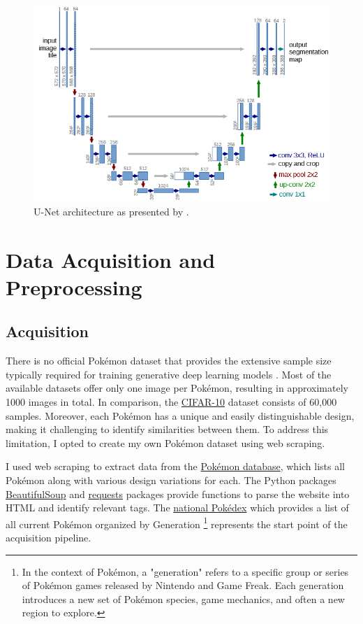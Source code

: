 \documentclass[12pt]{article}
\theoremstyle{plain}
\theoremstyle{definition}
\theoremstyle{remark}
\begin{document}
\begin{figure}[H]
	\centering
	\includegraphics[width=0.7\linewidth]{src/Images/u_net}
	\caption[U-Net architecture]{U-Net architecture as presented by \cite{Ronneberger2015}.}
	\label{fig:unet}
\end{figure}


\section{Data Acquisition and Preprocessing}
\label{sec:dataAca_and_preprocessing}
\subsection{Acquisition}
There is no official Pokémon dataset that provides the extensive sample size typically required for training generative deep learning models \citep{Yang2023}. Most of the available datasets offer only one image per Pokémon, resulting in approximately 1000 images in total. In comparison, the \href{https://www.cs.toronto.edu/~kriz/cifar.html}{\ac{CIFAR-10}} dataset consists of 60,000 samples. Moreover, each Pokémon has a unique and easily distinguishable design, making it challenging to identify similarities between them. To address this limitation, I opted to create my own Pokémon dataset using web scraping.

I used web scraping to extract data from the \href{https://pokemondb.net/}{Pokémon database}, which lists all Pokémon along with various design variations for each. The Python packages \href{https://www.crummy.com/software/BeautifulSoup/bs4/doc/}{BeautifulSoup} and \href{https://requests.readthedocs.io/en/latest/}{requests} packages provide functions to parse the website into \ac{HTML} and identify relevant tags. The \href{https://pokemondb.net/pokedex/national}{national Pokédex} which provides a list of all current Pokémon organized by Generation \footnote{In the context of Pokémon, a "generation" refers to a specific group or series of Pokémon games released by Nintendo and Game Freak. Each generation introduces a new set of Pokémon species, game mechanics, and often a new region to explore.} represents the start point of the acquisition pipeline.
\end{document}
